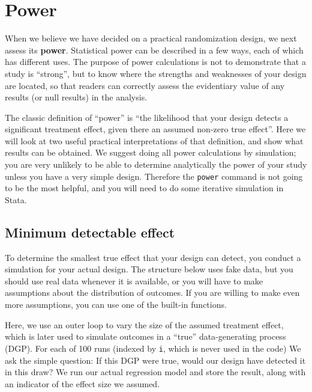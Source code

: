 {
}


\section{Power}

When we believe we have decided on a practical randomization design,
we next assess its \textbf{power}.
Statistical power can be described in a few ways,
each of which has different uses.
The purpose of power calculations is not to
demonstrate that a study is ``strong'',
but to know where the strengths and weaknesses
of your design are located, so that readers
can correctly assess the evidentiary value of
any results (or null results) in the analysis.

The classic definition of ``power'' is
``the likelihood that your design detects a significant treatment effect,
given there an assumed non-zero true effect''.
Here we will look at two useful practical interpretations
of that definition, and show what results can be obtained.
We suggest doing all power calculations by simulation;
you are very unlikely to be able to determine analytically
the power of your study unless you have a very simple design.
Therefore the \texttt{power} command is not going to be the most helpful,
and you will need to do some iterative simulation in Stata.

\subsection{Minimum detectable effect}

To determine the smallest true effect that your design can detect,
you conduct a simulation for your actual design.
The structure below uses fake data,
but you should use real data whenever it is available,
or you will have to make assumptions about the distribution of outcomes.
If you are willing to make even more assumptions,
you can use one of the built-in functions.

Here, we use an outer loop to vary the size of the assumed treatment effect,
which is later used to simulate outcomes in a ``true''
data-generating process (DGP).
For each of 100 runs (indexed by \texttt{i}, which is never used in the code)
We ask the simple question: If this DGP were true,
would our design have detected it in this draw?
We run our actual regression model and store the result,
along with an indicator of the effect size we assumed.

